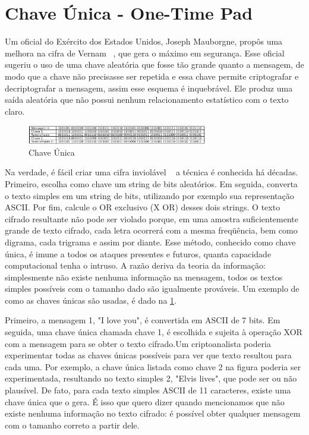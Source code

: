 \section{Chave Única - One-Time Pad}

Um oficial do Exército dos Estados Unidos, Joseph Mauborgne, propôs uma melhora na cifra de Vernam ~\cite{stallings}, que gera o máximo em segurança. Esse oficial sugeriu o uso de uma chave aleatória que fosse tão grande quanto a mensagem, de modo que a chave não precisasse ser repetida e essa chave permite criptografar e decriptografar a mensagem, assim esse esquema é inquebrável. Ele produz uma saída aleatória que não possui nenhum relacionamento estatístico com o texto claro.

\begin{figure}
	\begin{center}
		\includegraphics[width=0.7\textwidth]{criptografia3}
	\end{center}
	\caption{Chave Única ~\cite{tanenbaum}}
	\label{fig: criptografia3}
\end{figure}

Na verdade, é fácil criar uma cifra inviolável ~\cite{tanenbaum} a técnica é conhecida há décadas. Primeiro, escolha como chave um string de bits aleatórios. Em seguida, converta o texto simples em um string de bits, utilizando por exemplo sua representação ASCII. Por fim, calcule o OR exclusivo (X OR) desses dois strings. O texto cifrado resultante não pode ser violado porque, em uma amostra suficientemente grande de texto cifrado, cada letra ocorrerá com a mesma freqüência, bem como digrama, cada trigrama e assim por diante. Esse método, conhecido como chave única, é imune a todos os ataques presentes e futuros, quanta capacidade computacional tenha o intruso. A razão deriva da teoria da informação: simplesmente não existe nenhuma informação na mensagem, todos os textos simples possíveis com o tamanho dado são igualmente prováveis. Um exemplo de como as chaves únicas são usadas, é dado na \ref{fig: criptografia3}. 




Primeiro, a mensagem 1, "I love you", é convertida em ASCII de 7 bits. Em seguida, uma chave única chamada chave 1, é escolhida e sujeita à operação XOR com a mensagem para se obter o texto cifrado.Um criptoanalista poderia experimentar todas as chaves únicas possíveis para ver que texto resultou para cada uma. Por exemplo, a chave única listada como chave 2 na figura poderia ser experimentada, resultando no texto simples 2, "Elvis lives", que pode ser ou não plausível. De fato, para cada texto simples ASCII de 11 caracteres, existe uma chave única que o gera. É isso que quero dizer quando mencionamos que não existe nenhuma informação no texto cifrado: é possível obter qualquer mensagem com o tamanho correto a partir dele.
 
